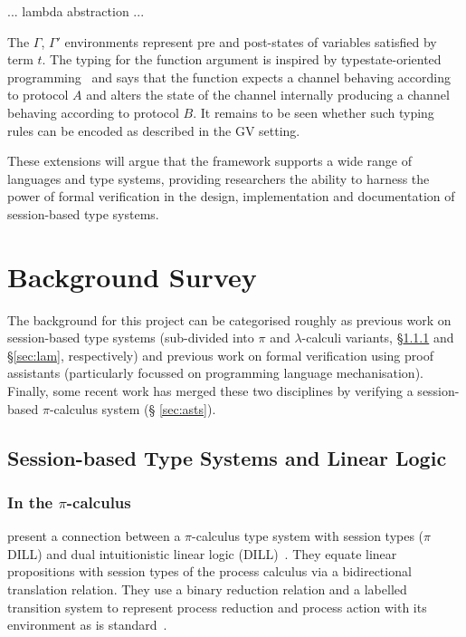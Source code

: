 \documentclass{mprop}
\newcommand{\1}{\textbf{1}\xspace}
\begin{document}
... lambda abstraction ...

The $\Gamma$, $\Gamma '$ environments represent pre and post-states of
variables satisfied by term $t$. The typing for the function argument is
inspired by typestate-oriented programming~\cite{Aldrich:2009} and says that
the function expects a channel behaving according to protocol $A$ and alters
the state of the channel internally producing a channel behaving according to
protocol $B$. It remains to be seen whether such typing rules can be encoded
as described in the GV setting.

These extensions will argue that the framework supports a wide range of
languages and type systems, providing researchers the ability to harness the
power of formal verification in the design, implementation and documentation
of session-based type systems.

\section{Background Survey}


The background for this project can be categorised roughly as previous work on
session-based type systems (sub-divided into $\pi$ and $\lambda$-calculi
variants, \S \ref{sec:pis} and \S \ref{sec:lam}, respectively) and previous
work on formal verification using proof assistants (particularly focussed on
programming language mechanisation). Finally, some recent work has merged
these two disciplines by verifying a session-based $\pi$-calculus system (\S
\ref{sec:asts}).

\subsection{Session-based Type Systems and Linear Logic}\label{sec:sts}

\subsubsection{In the \texorpdfstring{$\pi$}{pi}-calculus}\label{sec:pis}

\citeauthor{Caires:2010:STI} \cite{Caires:2010:STI} present a connection
between a $\pi$-calculus type system with session types ($\pi$DILL) and dual
intuitionistic linear logic (DILL)~\cite{Barber:1996}. They equate linear
propositions with session types of the process calculus via a bidirectional
translation relation. They use a binary reduction relation and a labelled
transition system to represent process reduction and process action with its
environment as is standard~\cite{Sangiorgi:2001}.
\end{document}
